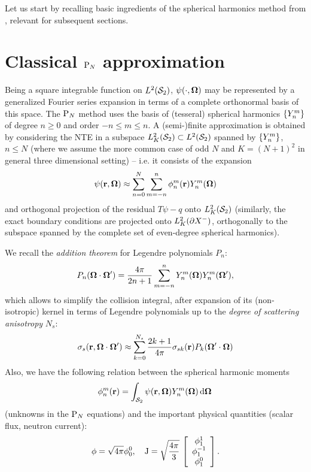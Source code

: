 Let us start by recalling basic ingredients of the spherical harmonics method from , relevant for
subsequent sections.

\section{Classical $\PN$ approximation}\label{sec:SPH}
Being a square integrable function on $\Lp[2](\Sphere)$, $\psi(\cdot,\bomega)$ may be represented by a generalized
Fourier series expansion in terms of a complete orthonormal basis of this space. The $\PN$ method uses the basis of
(tesseral) spherical harmonics $\{\Y{n}{m}\}$ of degree $n\geq 0$ and order $-n \leq m \leq n$. A (semi-)finite
approximation is obtained by considering the NTE in a subspace $\Lp[2]_K(\Sphere)\subset\Lp[2](\Sphere)$ 
spanned by $\{\Y{n}{m}\}$,  $n \leq N$ (where we assume the more common case of odd $N$ and $K = (N+1)^2$ in general
three dimensional setting) -- i.e.
it consists of the expansion
\begin{equation}\label{eq:exp}
  \psi(\br,\bomega) \approx \suma[n]{0}{N}\suma[m]{-n}{n}\angmom{n}{m}(\br)\Y{n}{m}(\bomega)
\end{equation}
and orthogonal projection of the residual $T\psi - q$ onto $\Lp[2]_K(\Sphere)$ (similarly, the exact boundary conditions 
are projected onto $\Lp[2]_K(\pX[-])$, orthogonally to the subspace spanned by the complete set of even-degree spherical
harmonics).

We recall the \textit{addition theorem} for Legendre polynomials $P_n$:
\begin{equation}\label{eq:addition}
  P_n(\bomega\cdot\bomega') = \frac{4\pi}{2n+1}\suma[m]{-n}{n}\Y{n}{m}(\bomega)\Y{n}{m}(\bomega'),
\end{equation}
which allows to simplify the collision integral, after expansion of its (non-isotropic) kernel in terms of 
Legendre polynomials up to the \textit{degree of scattering anisotropy} $N_s$:
\begin{equation}\label{eq:exp2}
  \sigma_s(\br,\bomega\cdot\bomega') \approx \suma[k]{0}{N_s}
      \frac{2k+1}{4\pi}\sigma_{sk}(\br)P_k(\bomega'\cdot\bomega)
\end{equation}
Also, we have the following relation between the spherical harmonic moments 
$$
	\angmom{n}{m}(\br) = \intA{\psi(\br,\bomega) \Y{n}{m}(\bomega)}
$$
(unknowns in the $\PN$ equations) and the important physical quantities (scalar flux, neutron current):
$$
	\phi = \sqrt{4\pi}\angmom{0}{0},\quad \bJ = \sqrt{\frac{4\pi }{3}}\, \left[\begin{array}{c}\angmom{1}{1}\\
	\angmom{1}{-1}\\ \angmom{1}{0}\end{array}\right].
$$

